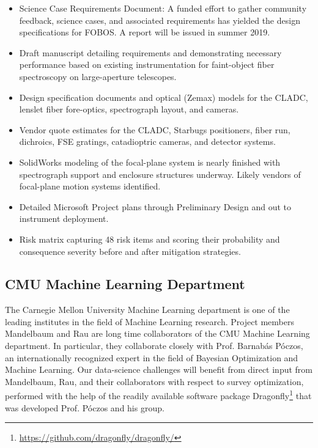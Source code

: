 \documentclass[oneside,11pt]{amsart}
\begin{document}
\begin{itemize}
%
\item Science Case Requirements Document: A funded effort to gather
community feedback, science cases, and associated requirements has
yielded the design specifications for FOBOS.  A report will be issued in
summer 2019.
%
\item Draft manuscript detailing requirements and demonstrating
necessary performance based on existing instrumentation for faint-object
fiber spectroscopy on large-aperture telescopes.
%
\item Design specification documents and optical (Zemax) models for the
CLADC, lenslet fiber fore-optics, spectrograph layout, and cameras.
%
\item Vendor quote estimates for the CLADC, Starbugs positioners, fiber
run, dichroics, FSE gratings, catadioptric cameras, and detector
systems.
%
\item SolidWorks modeling of the focal-plane system is nearly finished
with spectrograph support and enclosure structures underway.  Likely
vendors of focal-plane motion systems identified.
%
\item Detailed Microsoft Project plans through Preliminary Design and
out to instrument deployment.  
%
\item Risk matrix capturing 48 risk items and scoring their probability
and consequence severity before and after mitigation strategies.
%
\end{itemize}


\subsection*{CMU Machine Learning Department}

The Carnegie Mellon University Machine Learning department is one of the
leading institutes in the field of Machine Learning research.  Project
members Mandelbaum and Rau are long time collaborators of the CMU
Machine Learning department.  In particular, they collaborate closely
with Prof. Barnab{\'a}s P{\'o}czos, an internationally recognized expert
in the field of Bayesian Optimization and Machine Learning.  Our
data-science challenges will benefit from direct input from Mandelbaum,
Rau, and their collaborators with respect to survey optimization,
performed with the help of the readily available software package
Dragonfly\footnote{\url{https://github.com/dragonfly/dragonfly/}} that
was developed Prof. P{\'o}czos and his group.





\end{document}
